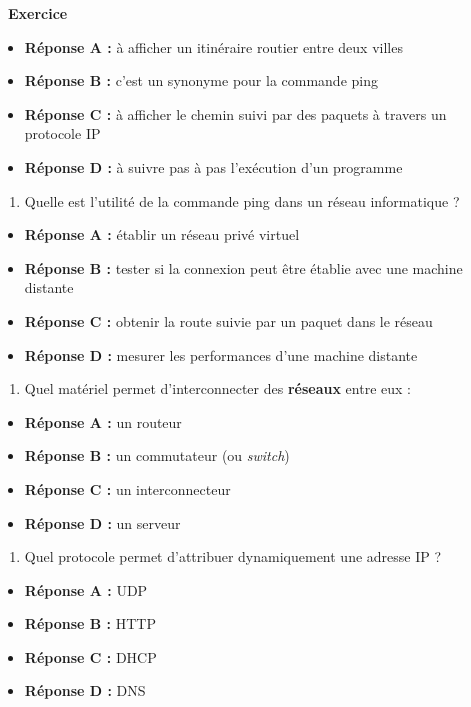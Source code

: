 \documentclass[
  11pt,
]{article}
\providecommand{\tightlist}{%
  \setlength{\itemsep}{0pt}\setlength{\parskip}{0pt}}
\newcounter{exo}
\newenvironment{exercice}[1]
{\par \medskip   \addtocounter{exo}{1} \noindent  
\begin{bclogo}[arrondi =0.1,   noborder = true, logo=\bccrayon, marge=4]{~\textbf{Exercice} \textbf{\theexo} {\itshape #1} }  \par}
{
\end{bclogo}
 \par \bigskip }
\newcounter{def}
\newcounter{prog}
\begin{document}
\begin{exercice}{}
\begin{itemize}
\tightlist
\item
  \textbf{Réponse A :} à afficher un itinéraire routier entre deux
  villes
\item
  \textbf{Réponse B :} c'est un synonyme pour la commande ping
\item
  \textbf{Réponse C :} à afficher le chemin suivi par des paquets à
  travers un protocole IP
\item
  \textbf{Réponse D :} à suivre pas à pas l'exécution d'un programme
\end{itemize}

\begin{enumerate}
\def\labelenumi{\arabic{enumi}.}
\setcounter{enumi}{3}
\tightlist
\item
  Quelle est l'utilité de la commande ping dans un réseau informatique ?
\end{enumerate}

\begin{itemize}
\tightlist
\item
  \textbf{Réponse A :} établir un réseau privé virtuel
\item
  \textbf{Réponse B :} tester si la connexion peut être établie avec une
  machine distante
\item
  \textbf{Réponse C :} obtenir la route suivie par un paquet dans le
  réseau
\item
  \textbf{Réponse D :} mesurer les performances d'une machine distante
\end{itemize}

\begin{enumerate}
\def\labelenumi{\arabic{enumi}.}
\setcounter{enumi}{4}
\tightlist
\item
  Quel matériel permet d'interconnecter des \textbf{réseaux} entre eux :
\end{enumerate}

\begin{itemize}
\tightlist
\item
  \textbf{Réponse A :} un routeur
\item
  \textbf{Réponse B :} un commutateur (ou \emph{switch})
\item
  \textbf{Réponse C :} un interconnecteur
\item
  \textbf{Réponse D :} un serveur
\end{itemize}

\begin{enumerate}
\def\labelenumi{\arabic{enumi}.}
\setcounter{enumi}{5}
\tightlist
\item
  Quel protocole permet d'attribuer dynamiquement une adresse IP ?
\end{enumerate}

\begin{itemize}
\tightlist
\item
  \textbf{Réponse A :} UDP
\item
  \textbf{Réponse B :} HTTP
\item
  \textbf{Réponse C :} DHCP
\item
  \textbf{Réponse D :} DNS
\end{itemize}

\end{exercice}
\end{document}
